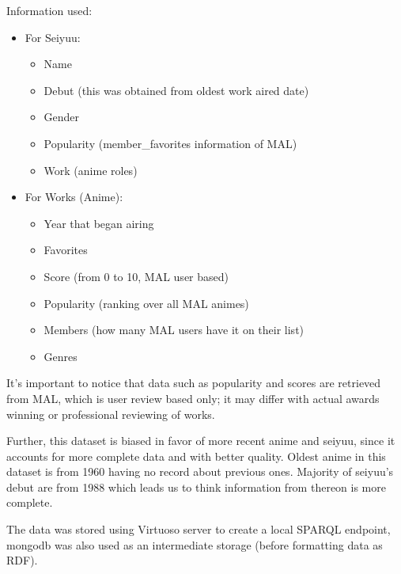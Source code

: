 Information used:
\begin{itemize}
	\item For Seiyuu:
	\begin{itemize}
		\item Name
		\item Debut (this was obtained from oldest work aired date)
		\item Gender
		\item Popularity (member\_favorites information of MAL)
		\item Work (anime roles)
	\end{itemize}
	\item For Works (Anime):
	\begin{itemize}
		\item Year that began airing
		\item Favorites
		\item Score (from 0 to 10, MAL user based)
		\item Popularity (ranking over all MAL animes)
		\item Members (how many MAL users have it on their list)
		\item Genres
	\end{itemize}
\end{itemize}

It's important to notice that data such as popularity and scores are retrieved from MAL, which is user review based only; it may differ with actual awards winning or professional reviewing of works.

Further, this dataset is biased in favor of more recent anime and seiyuu, since it accounts for more complete data and with better quality. Oldest anime in this dataset is from 1960 having no record about previous ones. Majority of seiyuu's debut are from 1988 which leads us to think information from thereon is more complete. 

The data was stored using Virtuoso server to create a local SPARQL endpoint, mongodb was also used as an intermediate storage (before formatting data as RDF).











